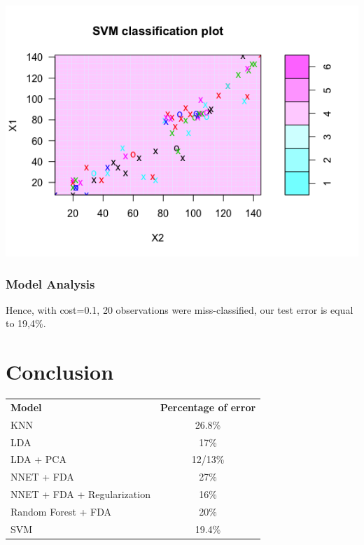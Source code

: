 \documentclass[]{report}
\begin{document}
\begin{center}
	\includegraphics[width=0.8\linewidth]{Figures/svm_test_plot.png}
	\label{SVM on test set}
\end{center}
\subsubsection{Model Analysis}
Hence, with cost=0.1, 20 observations were miss-classified, our test error is equal to 19,4\%.


\pagebreak
\section{Conclusion}
\begin{center}
\begin{tabular}{l c}
\textbf{Model} & \textbf{Percentage of error} \\
KNN & 26.8\% \\
LDA & 17\% \\
LDA + PCA & 12/13\% \\
NNET + FDA & 27\% \\
NNET + FDA + Regularization & 16\% \\
Random Forest + FDA & 20\% \\
SVM & 19.4\%
\end{tabular}
\end{center}
\end{document}
